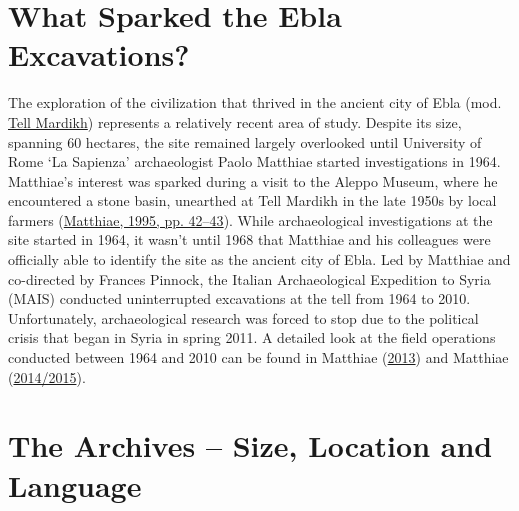 \documentclass[
]{book}
\begin{document}
\hypertarget{what-sparked-the-ebla-excavations}{%
\section{What Sparked the Ebla Excavations?}\label{what-sparked-the-ebla-excavations}}

The exploration of the civilization that thrived in the ancient city of Ebla (mod. \href{https://pleiades.stoa.org/places/869702586}{Tell Mardikh}) represents a relatively recent area of study. Despite its size, spanning 60 hectares, the site remained largely overlooked until University of Rome `La Sapienza' archaeologist Paolo Matthiae started investigations in 1964. Matthiae's interest was sparked during a visit to the Aleppo Museum, where he encountered a stone basin, unearthed at Tell Mardikh in the late 1950s by local farmers (\protect\hyperlink{ref-Matthiae1995a}{Matthiae, 1995, pp. 42--43}). While archaeological investigations at the site started in 1964, it wasn't until 1968 that Matthiae and his colleagues were officially able to identify the site as the ancient city of Ebla.
Led by Matthiae and co-directed by Frances Pinnock, the Italian Archaeological Expedition to Syria (MAIS) conducted uninterrupted excavations at the tell from 1964 to 2010. Unfortunately, archaeological research was forced to stop due to the political crisis that began in Syria in spring 2011. A detailed look at the field operations conducted between 1964 and 2010 can be found in Matthiae (\protect\hyperlink{ref-Matthiae2013d}{2013}) and Matthiae (\protect\hyperlink{ref-Matthiae2014d}{2014/2015}).

\hypertarget{the-archives-size-location-and-language}{%
\section{The Archives -- Size, Location and Language}\label{the-archives-size-location-and-language}}
\end{document}
